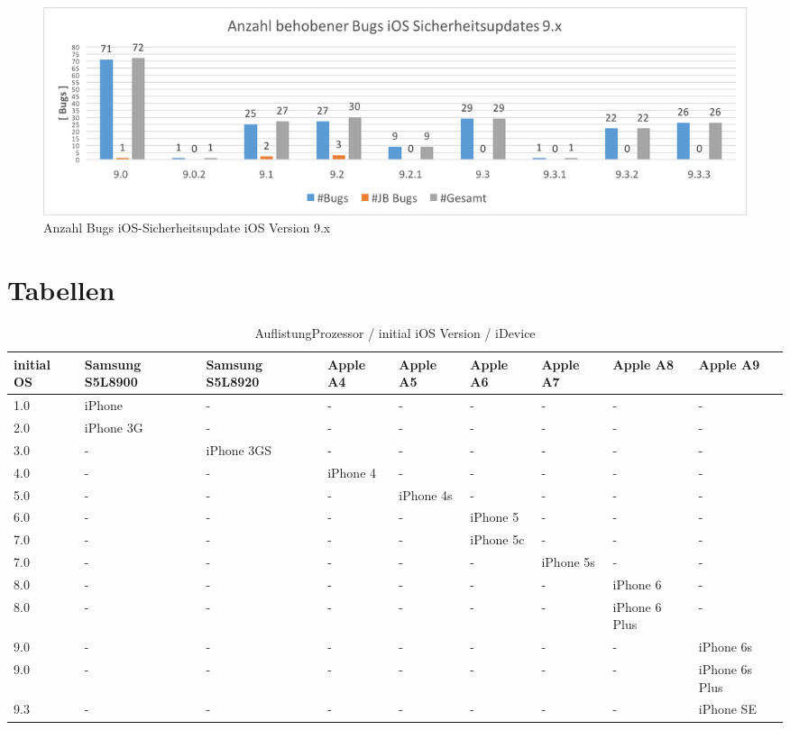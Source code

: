 \begin{figure}[ht!]
        \centering
                \includegraphics[scale=0.55]{Bilder/iOSSicherheitsupdate9.png}
        \caption{Anzahl Bugs iOS-Sicherheitsupdate iOS Version 9.x \protect\footnotemark}
        \label{fig:AnalyseiOSSicherheitsupdate9}
\end{figure}


\newpage
\chapter{Tabellen}
\begin{table}[htp!]
    \begin{center}
        \begin{tabular}{| p{8mm} | p{18mm} | p{18mm} | p{15mm} | p{15mm} | p{15mm} | p{15mm} | p{15mm} | p{15mm} |} \hline
\textbf{initial OS} & \textbf{Samsung S5L8900} & \textbf{Samsung S5L8920} & \textbf{Apple A4}	& \textbf{Apple A5}	& \textbf{Apple A6} & \textbf{Apple A7} & \textbf{Apple A8} & \textbf{Apple A9} \\ \hline
1.0 & iPhone & - & - &  - &  - & - &  - & - \\ \hline		
2.0 & iPhone 3G & - & - &  - &  - & - &  - & - \\ \hline				
3.0 & - & iPhone 3GS & - &  - &  - & - &  - & -	\\ \hline			
4.0 & - &  - & iPhone 4	 &  - &  - & - &  - & -	\\ \hline		
5.0 &  - & - &  - &	iPhone 4s &  - & - &  - & - \\ \hline		
6.0 &  - &  - & - &  - & iPhone 5 & - &  - & -	\\ \hline	
7.0 &  - &  - & - &  - & iPhone 5c	& - &  - & - \\ \hline	
7.0 & - &  - &  - & - &  - & iPhone 5s &  - & - \\ \hline
8.0 & - & - &  - &  - & - &  - & iPhone 6 & - \\ \hline
8.0 & - & - &  - &  - & - &  - & iPhone 6 Plus & -\\ \hline
9.0 & - & - &  - &  - & - &  - & - & iPhone 6s \\ \hline
9.0 & - & - &  - &  - & - &  - & - & iPhone 6s Plus \\ \hline
9.3 & - & - &  - &  - & - &  - & - & iPhone SE \\ \hline     
        \end{tabular} 
        \caption{AuflistungProzessor / initial iOS Version / iDevice  }
        \label{tab:AuflistungProziOSVersioniDevice}
    \end{center}
\end{table}

